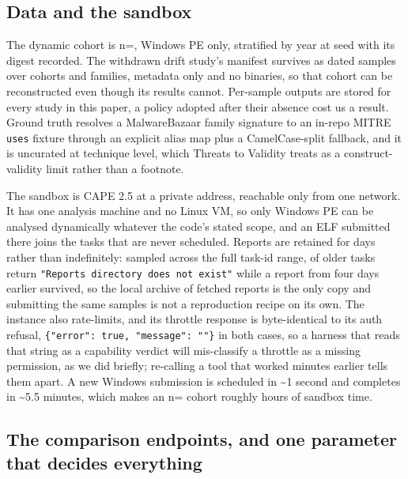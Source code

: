 \subsection{Data and the sandbox}\label{data}

The dynamic cohort is n=, Windows PE only, stratified by year at seed
 with its digest recorded. The withdrawn drift study's manifest survives as
 dated samples over  cohorts and  families,
metadata only and no binaries, so that cohort can be reconstructed even though its results cannot.
Per-sample outputs are stored for every study in this paper, a policy adopted after their absence
cost us a result. Ground truth resolves a MalwareBazaar family signature to an in-repo MITRE
\texttt{uses} fixture through an explicit alias map plus a CamelCase-split fallback, and it is
uncurated at technique level, which Threats to Validity treats as a construct-validity limit rather
than a footnote.

The sandbox is CAPE 2.5 at a private address, reachable only from one network. It has one analysis
machine and no Linux VM, so only Windows PE can be analysed dynamically whatever the code's stated
scope, and an ELF submitted there joins the  tasks that are never scheduled.
Reports are retained for days rather than indefinitely: sampled across the full task-id range,
 of  older tasks return
\texttt{"Reports\ directory\ does\ not\ exist"} while a report from four days earlier survived, so
the local archive of fetched reports is the only copy and submitting the same samples is not a
reproduction recipe on its own. The instance also rate-limits, and its throttle response is
byte-identical to its auth refusal, \texttt{\{"error":\ true,\ "message":\ ""\}} in both cases, so a
harness that reads that string as a capability verdict will mis-classify a throttle as a missing
permission, as we did briefly; re-calling a tool that worked minutes earlier tells them apart. A new
Windows submission is scheduled in \textasciitilde1 second and completes in \textasciitilde5.5
minutes, which makes an n= cohort roughly  hours of sandbox
time.

\subsection{The comparison endpoints, and one parameter that decides everything}\label{the-comparison-endpoints-and-one-parameter-that-decides-everything}

